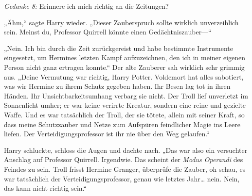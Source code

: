 \emph{Gedanke 8:} Erinnere ich mich richtig an die Zeitungen?

„Ähm,“ sagte Harry wieder. „Dieser Zauberspruch sollte wirklich unverzeihlich sein. Meinst du, Professor Quirrell könnte einen Gedächtniszauber—“

„Nein. Ich bin durch die Zeit zurückgereist und habe bestimmte Instrumente eingesetzt, um Hermines letzten Kampf aufzuzeichnen, den ich in meiner eigenen Person nicht ganz ertragen konnte.“
Der alte Zauberer sah wirklich sehr grimmig aus.
„Deine Vermutung war richtig, Harry Potter. Voldemort hat alles sabotiert, was wir Hermine zu ihrem Schutz gegeben haben. Ihr Besen lag tot in ihren Händen. Ihr Unsichtbarkeitsumhang verbarg sie nicht. Der Troll lief unverletzt im Sonnenlicht umher; er war keine verirrte Kreatur, sondern eine reine und gezielte Waffe. Und es war tatsächlich der Troll, der sie tötete, allein mit seiner Kraft, so dass meine Schutzzauber und Netze zum Aufspüren feindlicher Magie ins Leere liefen. Der Verteidigungsprofessor ist ihr nie über den Weg gelaufen.“

Harry schluckte, schloss die Augen und dachte nach.
„Das war also ein versuchter Anschlag auf Professor Quirrell. Irgendwie. Das scheint der \emph{Modus Operandi} des Feindes zu sein. Troll frisst Hermine Granger, überprüfe die Zauber, oh schau, es war tatsächlich der Verteidigungsprofessor, genau wie letztes Jahr… nein. Nein, das kann nicht richtig sein.“

